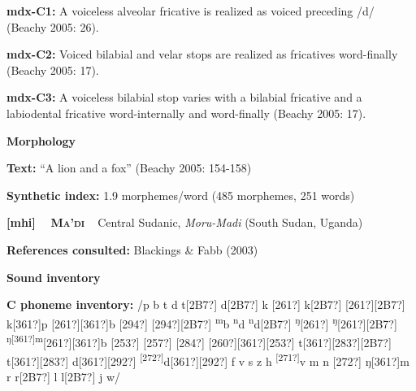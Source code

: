 \begin{styleBody}
\textbf{mdx-C1: }A voiceless alveolar fricative is realized as voiced preceding /d/ (Beachy 2005: 26).
\end{styleBody}

\begin{styleBody}
\textbf{mdx-C2: }Voiced bilabial and velar stops are realized as fricatives word-finally (Beachy 2005: 17).
\end{styleBody}

\begin{styleBody}
\textbf{mdx-C3: }A voiceless bilabial stop varies with a bilabial fricative and a labiodental fricative word-internally and word-finally (Beachy 2005: 17).
\end{styleBody}

\begin{styleBody}
\textbf{Morphology}
\end{styleBody}

\begin{styleBody}
\textbf{Text: }“A lion and a fox” (Beachy 2005: 154-158)
\end{styleBody}

\begin{styleBody}
\textbf{Synthetic index: }1.9 morphemes/word (485 morphemes, 251 words)
\end{styleBody}

\clearpage\begin{styleBody}
\textbf{[mhi] }\ \ \textbf{\textsc{Ma’di}}\textbf{\ \ }Central Sudanic, \textit{Moru-Madi} (South Sudan, Uganda)
\end{styleBody}

\begin{styleBody}
\textbf{References consulted: }Blackings \& Fabb (2003)
\end{styleBody}

\begin{styleBody}
\textbf{Sound inventory}
\end{styleBody}

\begin{styleBody}
\textbf{C phoneme inventory:} /p b t d t[2B7?] d[2B7?] k [261?] k[2B7?] [261?][2B7?] k[361?]p [261?][361?]b [294?] [294?][2B7?] \textsuperscript{m}b \textsuperscript{n}d \textsuperscript{n}d[2B7?] \textsuperscript{ŋ}[261?] \textsuperscript{ŋ}[261?][2B7?] \textsuperscript{ŋ[361?]m}[261?][361?]b [253?] [257?] [284?] [260?][361?][253?] t[361?][283?][2B7?] t[361?][283?] d[361?][292?] \textsuperscript{[272?]}d[361?][292?] f v s z h \textsuperscript{[271?]}v m n [272?] ŋ[361?]m r r[2B7?] l l[2B7?] j w/
\end{styleBody}

